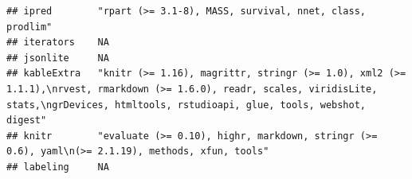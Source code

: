 \documentclass[]{article}
\begin{document}
\begin{verbatim}
## ipred        "rpart (>= 3.1-8), MASS, survival, nnet, class, prodlim"                                                                                                                                                                                                                                                                                                                                                                                                                              
## iterators    NA                                                                                                                                                                                                                                                                                                                                                                                                                                                                                    
## jsonlite     NA                                                                                                                                                                                                                                                                                                                                                                                                                                                                                    
## kableExtra   "knitr (>= 1.16), magrittr, stringr (>= 1.0), xml2 (>= 1.1.1),\nrvest, rmarkdown (>= 1.6.0), readr, scales, viridisLite, stats,\ngrDevices, htmltools, rstudioapi, glue, tools, webshot, digest"                                                                                                                                                                                                                                                                                      
## knitr        "evaluate (>= 0.10), highr, markdown, stringr (>= 0.6), yaml\n(>= 2.1.19), methods, xfun, tools"                                                                                                                                                                                                                                                                                                                                                                                      
## labeling     NA                                                                                                                                                                                                                                                                                                                                                                                                                                                                                    

\end{verbatim}
\end{document}
